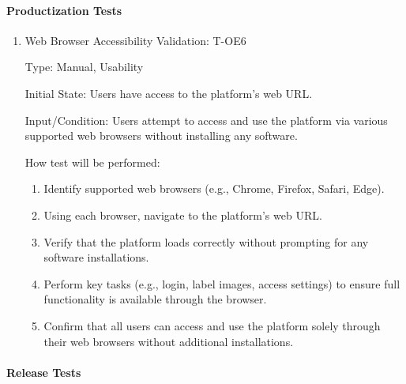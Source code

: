 \documentclass[12pt, titlepage]{article}
\begin{document}
\paragraph{Productization Tests}
\begin{enumerate}

\item{Web Browser Accessibility Validation: T-OE6\\}

Type: Manual, Usability

Initial State: Users have access to the platform's web URL.

Input/Condition: Users attempt to access and use the platform via various supported web browsers without installing any software.

How test will be performed:
\begin{enumerate}
    \item Identify supported web browsers (e.g., Chrome, Firefox, Safari, Edge).
    \item Using each browser, navigate to the platform's web URL.
    \item Verify that the platform loads correctly without prompting for any software installations.
    \item Perform key tasks (e.g., login, label images, access settings) to ensure full functionality is available through the browser.
    \item Confirm that all users can access and use the platform solely through their web browsers without additional installations.
\end{enumerate}

\end{enumerate}

\paragraph{Release Tests}
\end{document}
